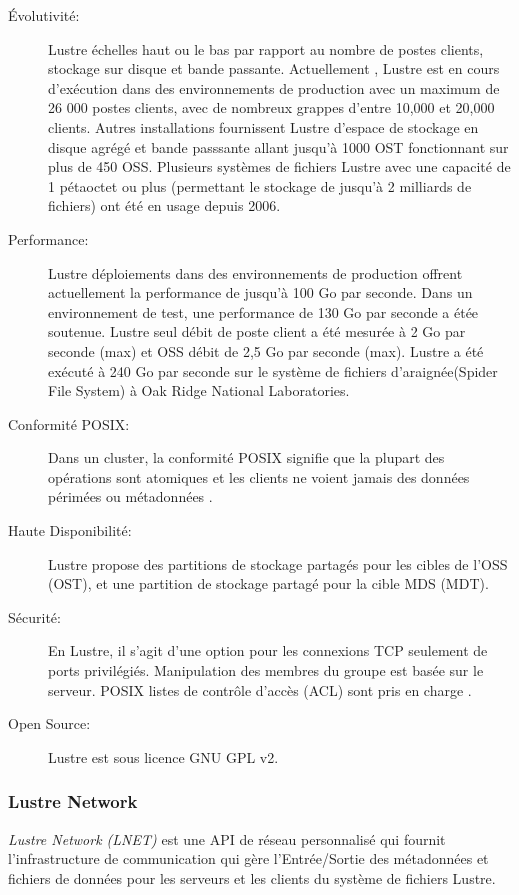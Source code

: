 \documentclass[12pt]{article}
\begin{document}
\begin{description}

\item[Évolutivité: ]
 Lustre échelles haut ou le bas par rapport au nombre de postes clients, stockage sur disque et bande passante. Actuellement , Lustre est en cours d'exécution dans des environnements de production avec un maximum de 26 000 postes clients, avec de nombreux grappes d'entre 10,000 et 20,000 clients. Autres installations fournissent Lustre d'espace de stockage en disque agrégé et bande passsante allant jusqu'à 1000 OST fonctionnant sur plus de 450 OSS. Plusieurs systèmes de fichiers Lustre avec une capacité de 1 pétaoctet ou plus (permettant le stockage de jusqu'à 2 milliards de fichiers) ont été en usage depuis 2006.
\item[Performance: ]
 Lustre déploiements dans des environnements de production offrent actuellement la performance de jusqu'à 100 Go par seconde. Dans un environnement de test, une performance de 130 Go par seconde a étée soutenue. Lustre seul débit de poste client a été mesurée à 2 Go par seconde (max) et OSS débit de 2,5 Go par seconde (max). Lustre a été exécuté à 240 Go par seconde sur le système de fichiers d'araignée(Spider File System) à Oak Ridge National Laboratories.

\item[Conformité POSIX:]Dans un cluster, la conformité POSIX signifie que la plupart des opérations sont atomiques et les clients ne voient jamais des données périmées ou métadonnées .
\item[Haute Disponibilité:]Lustre propose des partitions de stockage partagés pour les cibles de l'OSS (OST), et une partition de stockage partagé pour la cible MDS (MDT).

\item[Sécurité:]En Lustre, il s'agit d'une option pour les connexions TCP seulement de ports privilégiés. Manipulation des membres du groupe est basée sur le serveur. POSIX listes de contrôle d'accès (ACL) sont pris en charge .
\item[Open Source:] Lustre est sous licence GNU GPL v2.
\item[]
\end{description}
\subsubsection{Lustre Network}

\textit{Lustre Network (LNET)} est une API de réseau personnalisé qui fournit l'infrastructure de communication qui gère l'Entrée/Sortie des métadonnées et fichiers de données pour les serveurs et les clients du système de fichiers Lustre.
\end{document}
